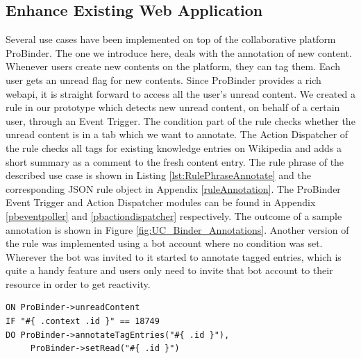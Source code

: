 \subsection{Enhance Existing Web Application}
Several use cases have been implemented on top of the collaborative platform \textrm{ProBinder}.
The one we introduce here, deals with the annotation of new content.
Whenever users create new contents on the platform, they can tag them.
Each user gets an unread flag for new contents.
Since \textrm{ProBinder} provides a rich \textrm{\gls{webapi}}, it is straight forward to access all the user's unread content.
We created a rule in our prototype which detects new unread content, on behalf of a certain user, through an \textrm{Event Trigger}.
The condition part of the rule checks whether the unread content is in a tab which we want to annotate.
The \textrm{Action Dispatcher} of the rule checks all tags for existing knowledge entries on \textrm{Wikipedia} and adds a short summary as a comment to the fresh content entry.
The rule phrase of the described use case is shown in Listing \ref{lst:RulePhraseAnnotate} and the corresponding JSON rule object in Appendix \ref{ruleAnnotation}.
The \textrm{ProBinder Event Trigger} and \textrm{Action Dispatcher} modules can be found in Appendix \ref{pbeventpoller} and \ref{pbactiondispatcher} respectively.
The outcome of a sample annotation is shown in Figure \ref{fig:UC_Binder_Annotations}.
Another version of the rule was implemented using a bot account where no condition was set.
Wherever the bot was invited to it started to annotate tagged entries, which is quite a handy feature and users only need to invite that bot account to their resource in order to get reactivity.

\begin{lstlisting}[float=h,language=OwnRule,label={lst:RulePhraseAnnotate},caption=Rule Phrase for ProBinder Annotations]
ON ProBinder->unreadContent
IF "#{ .context .id }" == 18749
DO ProBinder->annotateTagEntries("#{ .id }"),
	 ProBinder->setRead("#{ .id }")
\end{lstlisting}

